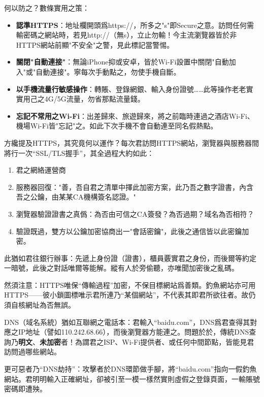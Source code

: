 何以防之？數條實用之策：

\begin{itemize}
  \item \textbf{認準HTTPS}：地址欄開頭爲https://，所多之"s"即Secure之意。訪問任何需輸密碼之網站時，若見http://（無s），立止勿輸！今主流瀏覽器皆於非HTTPS網站前顯"不安全"之警，見此標記當警惕。
  \item \textbf{關閉"自動連接"}：無論iPhone抑或安卓，皆於Wi-Fi設置中關閉"自動加入"或"自動連接"。寧每次手動點之，勿使手機自斷。
  \item \textbf{以手機流量行敏感操作}：轉賬、登錄網銀、輸入身份證號……此等操作老老實實用己之4G/5G流量，勿省那點流量錢。
  \item \textbf{忘記不常用之Wi-Fi}：出差歸來、旅遊歸來，將之前臨時連過之酒店Wi-Fi、機場Wi-Fi皆"忘記"之。如此下次手機不會自動連至同名假熱點。
\end{itemize}


方纔提及HTTPS，其究竟何以運作？每次君訪問HTTPS網站，瀏覽器與服務器間將行一次“SSL/TLS握手”，其全過程大約如此：

\begin{enumerate}
  \item 君之網絡運營商
  \item 服務器回復："善，吾自君之清單中擇此加密方案，此乃吾之數字證書，內含吾之公鑰，由某某CA機構簽名認證。"
  \item 瀏覽器驗證證書之真僞：為否由可信之CA簽發？為否過期？域名為否相符？
  \item 驗證既過，雙方以公鑰加密協商出一"會話密鑰"，此後之通信皆以此密鑰加密。
\end{enumerate}

此猶如君往銀行辦事：先遞上身份證（證書），櫃員覈實君之身份，而後爾等約定一暗號，此後之對話唯爾等能解。縱有人於旁偷聽，亦唯聞加密後之亂碼。

然須注意：HTTPS唯保“傳輸過程”加密，不保目標網站爲善類。釣魚網站亦可用HTTPS——彼小鎖圖標唯示君所連乃“某個網站”，不代表其即君所欲往者。故仍須自核網址為否無誤。


DNS（域名系統）猶如互聯網之電話本：君輸入“baidu.com”，DNS爲君查得其對應之IP地址（譬如110.242.68.66），而後瀏覽器方能連之。問題於於，傳統DNS查詢乃\textbf{明文}、\textbf{未加密}者！為謂君之ISP、Wi-Fi提供者、或任何中間節點，皆能見君訪問過哪些網站。

更可惡者乃“DNS劫持”：攻擊者於DNS環節做手腳，將“baidu.com”指向一假釣魚網站。君明明輸入正確網址，卻被引至一模一樣然實則虛假之登錄頁面，一輸賬號密碼即遭殃。

